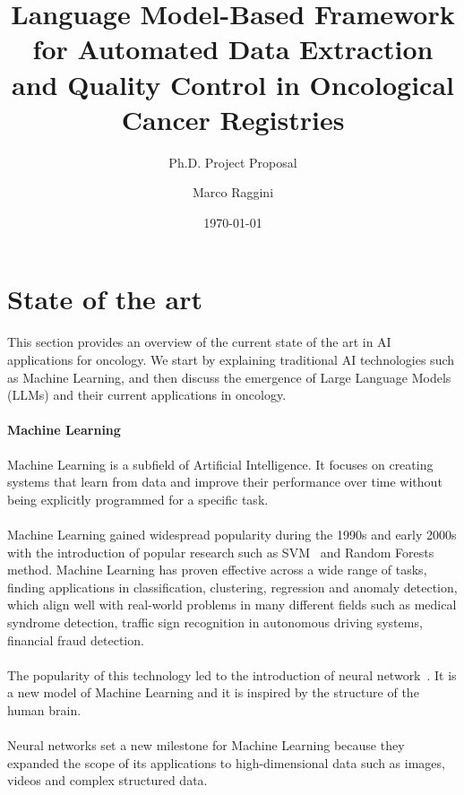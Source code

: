 \documentclass{scrartcl}
\title{\LARGE
    Language Model-Based Framework for Automated Data Extraction and Quality Control in Oncological Cancer Registries
}
\subtitle{Ph.D. Project Proposal}
\author{
    Marco Raggini
}
\date{
    \today
}
\begin{document}
\maketitle
\section{State of the art} \label{state-of-art}
This section provides an overview of the current state of the art in AI applications for oncology. We start by explaining traditional AI technologies
such as Machine Learning, and then discuss the emergence of Large Language Models (LLMs) and their current applications in oncology.

\paragraph{Machine Learning}{Machine Learning is a subfield of Artificial Intelligence. It focuses on creating systems that learn from data and improve their performance over time without being explicitly programmed for a specific task.
\\\\
Machine Learning gained widespread popularity during the 1990s and early 2000s with the introduction of popular research such as SVM~\cite{svm1995} and Random Forests~\cite{breiman2001} method. 
Machine Learning has proven effective across a wide range of tasks, finding applications in classification, clustering, regression and anomaly detection, which align well with real-world problems in many different fields such as medical syndrome detection, traffic sign recognition in autonomous driving systems, financial fraud detection.
\\\\
The popularity of this technology led to the introduction of neural network~\cite{lecun2015}. It is a new model of Machine Learning and it is inspired by the structure of the human brain.
\\\\
Neural networks set a new milestone for Machine Learning because they expanded the scope of its applications to high-dimensional data such as images, videos and complex structured data.}
\end{document}
